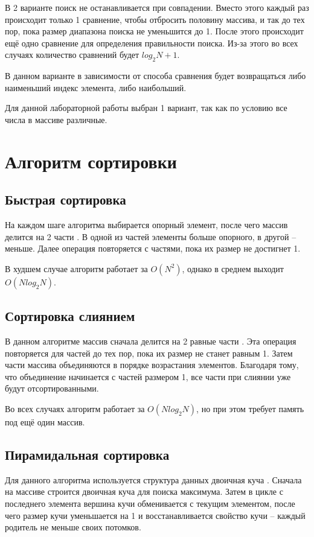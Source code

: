 В 2 варианте поиск не останавливается при совпадении. Вместо этого каждый раз происходит только 1 сравнение, чтобы отбросить половину массива, и так до тех пор, пока размер диапазона поиска не уменьшится до 1. После этого происходит ещё одно сравнение для определения правильности поиска. Из-за этого во всех случаях количество сравнений будет $log_2{N} + 1$.

В данном варианте в зависимости от способа сравнения будет возвращаться либо наименьший индекс элемента, либо наибольший.

Для данной лабораторной работы выбран 1 вариант, так как по условию все числа в массиве различные. 

\section{Алгоритм сортировки}

\subsection{Быстрая сортировка}

На каждом шаге алгоритма выбирается опорный элемент, после чего массив делится на 2 части \cite{sort}. В одной из частей элементы больше опорного, в другой -- меньше. Далее операция повторяется с частями, пока их размер не достигнет 1.

В худшем случае алгоритм работает за $O(N^2)$, однако в среднем выходит $O(Nlog_2N)$.

\subsection{Сортировка слиянием}

В данном алгоритме массив сначала делится на 2 равные части \cite{sort}. Эта операция повторяется для частей до тех пор, пока их размер не станет равным 1. Затем части массива объединяются в порядке возрастания элементов. Благодаря тому, что объединение начинается с частей размером 1, все части при слиянии уже будут отсортированными.

Во всех случаях алгоритм работает за $O(Nlog_2N)$, но при этом требует память под ещё один массив.

\subsection{Пирамидальная сортировка}

Для данного алгоритма используется структура данных двоичная куча \cite{sort}. Сначала на массиве строится двоичная куча для поиска максимума. Затем в цикле с последнего элемента вершина кучи обменивается с текущим элементом, после чего размер кучи уменьшается на 1 и восстанавливается свойство кучи -- каждый родитель не меньше своих потомков.

